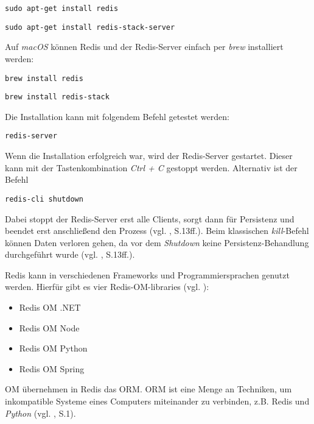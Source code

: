 \texttt{sudo apt-get install redis}

\texttt{sudo apt-get install redis-stack-server}

\vspace{0.4cm}

Auf \textit{macOS} können \ac{Redis} und der \ac{Redis}-Server einfach per \textit{brew} installiert werden:

\texttt{brew install redis}

\texttt{brew install redis-stack}

\vspace{0.4cm}

Die Installation kann mit folgendem Befehl getestet werden:

\texttt{redis-server}

Wenn die Installation erfolgreich war, wird der \ac{Redis}-Server gestartet. Dieser kann mit der Tastenkombination \textit{Ctrl + C} gestoppt werden. Alternativ ist der Befehl 

\texttt{redis-cli shutdown} 

Dabei stoppt der \ac{Redis}-Server erst alle Clients, sorgt dann für Persistenz und beendet erst anschließend den Prozess (vgl. \cite{3}, S.13ff.). Beim klassischen \textit{kill}-Befehl können Daten verloren gehen, da vor dem \textit{Shutdown} keine Persistenz-Behandlung durchgeführt wurde (vgl. \cite{3}, S.13ff.).

\ac{Redis} kann in verschiedenen Frameworks und Programmiersprachen genutzt werden. Hierfür gibt es vier \ac{Redis}-\acs{OM}-libraries (vgl. \cite{Redis-Docs-Redis-Stack}): 

\begin{itemize}
	\item Redis OM .NET
	\item Redis OM Node
	\item Redis OM Python
	\item Redis OM Spring
\end{itemize}

\ac{OM} übernehmen in \ac{Redis} das \ac{ORM}. \ac{ORM} ist eine Menge an Techniken, um inkompatible Systeme eines Computers miteinander zu verbinden, z.B. \ac{Redis} und \textit{Python} (vgl. \cite{16}, S.1).





